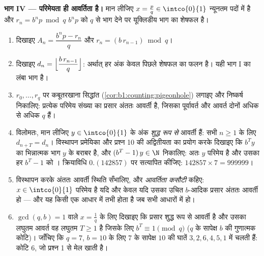 \begin{problem}
\medskip \noindent\textbf{भाग IV --- परिमेयता ही आवर्तिता है।} मान लीजिए $x
= \frac pq \in \intco{0}{1}$ न्यूनतम पदों में है और $r_n = b^n p \bmod q$
$b^n p$ को $q$ से भाग देने पर यूक्लिडीय भाग का शेषफल है।
\begin{enumerate}[resume]
  \item दिखाइए $A_n = \dfrac{b^n p - r_n}{q}$ और $r_n = (b\,r_{n-1}) \bmod
  q$।
  \item दिखाइए $d_n = \Bigl\lfloor \dfrac{b\,r_{n-1}}{q} \Bigr\rfloor$:
  अर्थात् हर अंक केवल पिछले शेषफल का फलन है। यही भाग I का लंबा भाग है।
  \item $r_0, \dots, r_q$ पर कबूतरखाना सिद्धांत
  (\cref{cor:b1:counting:pigeonhole}) लगाइए और निष्कर्ष निकालिए: प्रत्येक
  परिमेय संख्या का प्रसार अंततः आवर्ती है, जिसका पूर्वावर्त और आवर्त दोनों
  अधिक से अधिक $q$ हैं।
  \item विलोमतः, मान लीजिए $y \in \intco{0}{1}$ के अंक \emph{शुद्ध रूप से}
  आवर्ती हैं: सभी $n \geq 1$ के लिए $d_{n+T} = d_n$। विस्थापन प्रमेयिका और
  प्रश्न 10 की अद्वितीयता का प्रयोग करके दिखाइए कि $b^T y$ का भिन्नात्मक भाग
  $y$ के बराबर है, और $(b^T - 1)\,y \in \N$ निकालिए: अतः $y$ परिमेय है और
  उसका हर $b^T - 1$ को । क्रियाविधि $0.(142857)$ पर सत्यापित
  कीजिए: $142857 \times 7 = 999999$।
  \item विस्थापन करके अंततः आवर्ती स्थिति सँभालिए, और \emph{आवर्तिता कसौटी}
  कहिए: $x \in \intco{0}{1}$ परिमेय है यदि और केवल यदि उसका उचित $b$-आदिक
  प्रसार अंततः आवर्ती हो --- और यह किसी एक आधार में तभी होता है जब सभी
  आधारों में हो।
  \item $\gcd(q, b) = 1$ वाले $x = \frac 1q$ के लिए दिखाइए कि प्रसार शुद्ध
  रूप से आवर्ती है और उसका लघुतम आवर्त वह लघुतम $T \geq 1$ है जिसके लिए $b^T
  \equiv 1 \pmod q$ ($q$ के सापेक्ष $b$ की गुणात्मक कोटि)। जाँचिए कि $q =
  7$, $b = 10$ के लिए $7$ के सापेक्ष $10$ की घातें $3, 2, 6, 4, 5, 1$ में
  चलती हैं: कोटि $6$, जो प्रश्न 1 से मेल खाती है।
\end{enumerate}


\end{problem}
